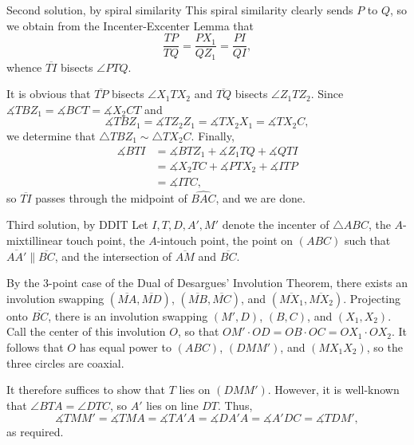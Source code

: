 \begin{customenv}{Second solution, by spiral similarity}
    This spiral similarity clearly sends $P$ to $Q$, so we obtain from the Incenter-Excenter Lemma that \[\frac{TP}{TQ}=\frac{PX_1}{QZ_1}=\frac{PI}{QI},\]
    whence $\overline{TI}$ bisects $\angle PTQ$.

    It is obvious that $\overline{TP}$ bisects $\angle X_1TX_2$ and $\overline{TQ}$ bisects $\angle Z_1TZ_2$. Since $\measuredangle TBZ_1=\measuredangle BCT=\measuredangle X_2CT$ and \[\measuredangle TBZ_1=\measuredangle TZ_2Z_1=\measuredangle TX_2X_1=\measuredangle TX_2C,\]
    we determine that $\triangle TBZ_1\sim\triangle TX_2C$. Finally,
    \begin{align*}
        \measuredangle BTI&=\measuredangle BTZ_1+\measuredangle Z_1TQ+\measuredangle QTI\\
        &=\measuredangle X_2TC+\measuredangle PTX_2+\measuredangle ITP\\
        &=\measuredangle ITC,
    \end{align*}
    so $\overline{TI}$ passes through the midpoint of $\widehat{BAC}$, and we are done. 
\end{customenv}
\begin{customenv}{Third solution, by DDIT}
    Let $I,T,D,A',M'$ denote the incenter of $\triangle ABC$, the $A$-mixtillinear touch point, the $A$-intouch point, the point on $(ABC)$ such that $\overline{AA'}\parallel\overline{BC}$, and the intersection of $\overline{AM}$ and $\overline{BC}$.

    By the $3$-point case of the Dual of Desargues' Involution Theorem, there exists an involution swapping $(\overline{MA},\overline{MD})$, $(\overline{MB},\overline{MC})$, and $(\overline{MX_1},\overline{MX_2})$. Projecting onto $\overline{BC}$, there is an involution swapping $(M',D)$, $(B,C)$, and $(X_1,X_2)$. Call the center of this involution $O$, so that $OM'\cdot OD=OB\cdot OC=OX_1\cdot OX_2$. It follows that $O$ has equal power to $(ABC)$, $(DMM')$, and $(MX_1X_2)$, so the three circles are coaxial.

    It therefore suffices to show that $T$ lies on $(DMM')$. However, it is well-known that $\angle BTA=\angle DTC$, so $A'$ lies on line $DT$. Thus, \[\measuredangle TMM'=\measuredangle TMA=\measuredangle TA'A=\measuredangle DA'A=\measuredangle A'DC=\measuredangle TDM',\]
    as required. 
\end{customenv}

